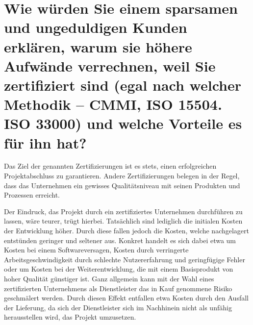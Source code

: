 \section{Wie würden Sie einem sparsamen und ungeduldigen Kunden erklären, warum sie höhere Aufwände verrechnen, weil Sie zertifiziert sind (egal nach welcher Methodik – CMMI, ISO 15504. ISO 33000) und welche Vorteile es für ihn hat?}
Das Ziel der genannten Zertifizierungen ist es stets, einen erfolgreichen Projektabschluss zu garantieren. Andere Zertifizierungen belegen in der Regel, dass das Unternehmen ein gewisses Qualitätsniveau mit seinen Produkten und Prozessen erreicht.

Der Eindruck, das Projekt durch ein zertifiziertes Unternehmen durchführen zu lassen, wäre teurer, trügt hierbei. Tatsächlich sind lediglich die initialen Kosten der Entwicklung höher. Durch diese fallen jedoch die Kosten, welche nachgelagert entstünden geringer und seltener aus. Konkret handelt es sich dabei etwa um Kosten bei einem Softwareversagen, Kosten durch verringerte Arbeitsgeschwindigkeit durch schlechte Nutzererfahrung und geringfügige Fehler oder um Kosten bei der Weiterentwicklung, die mit einem Basisprodukt von hoher Qualität günstiger ist. Ganz allgemein kann mit der Wahl eines zertifizierten Unternehmens als Dienstleister das in Kauf genommene Risiko geschmälert werden. Durch diesen Effekt entfallen etwa Kosten durch den Ausfall der Lieferung, da sich der Dienstleister sich im Nachhinein nicht als unfähig herausstellen wird, das Projekt umzusetzen.